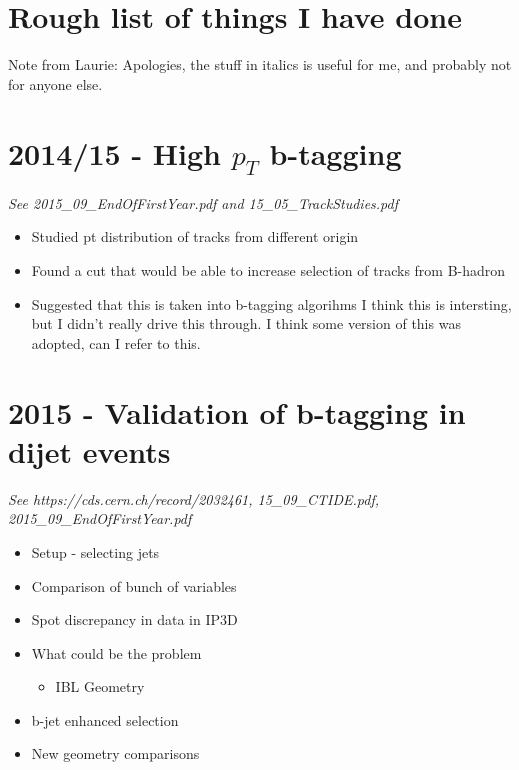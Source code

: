\newpage

\section{Rough list of things I have done}

Note from Laurie: Apologies, the stuff in italics is useful for me, and probably not for anyone else.

\section{2014/15 - High $p_{T}$ b-tagging}
\textit{See 2015\_09\_EndOfFirstYear.pdf and 15\_05\_TrackStudies.pdf  }
\begin{itemize}
\item{Studied pt distribution of tracks from different origin}
\item{Found a cut that would be able to increase selection of tracks from B-hadron}
\item{Suggested that this is taken into b-tagging algorihms}
  I think this is intersting, but I didn't really drive this through.
  I think some version of this was adopted, can  I refer to this.  
\end{itemize}

\section{2015 - Validation of b-tagging in dijet events}
\textit{See https://cds.cern.ch/record/2032461, 15\_09\_CTIDE.pdf, 2015\_09\_EndOfFirstYear.pdf }
\begin{itemize}
\item{Setup - selecting jets}
\item{Comparison of bunch of variables}
\item{Spot discrepancy in data in IP3D}
\item{What could be the problem}
  \begin{itemize}[label={$-$}]
  \item{IBL Geometry}
  \end{itemize}
\item{b-jet enhanced selection}
\item{New geometry comparisons}
\end{itemize}

